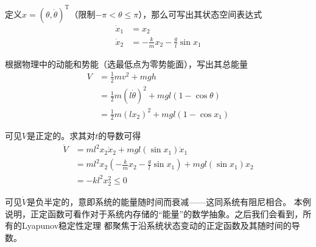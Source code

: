 \begin{example}[正定函数与能量]
  定义$x=(\theta,\dot{\theta})^\mathrm{T}$（限制$-\pi<\theta\le \pi$），那么可写出其状态空间表达式
  \begin{align*}
    \dot{x}_1&=x_2\\
    \dot{x}_2&=-\frac{k}{m}x_2-\frac{g}{l}\sin x_1
  \end{align*}
  
  根据物理中的动能和势能（选最低点为零势能面），写出其总能量\begin{align*}
    V&=\frac{1}{2}mv^2+mgh\\
    &=\frac{1}{2}m(l\dot{\theta})^2+mgl(1-\cos\theta)\\
    &=\frac{1}{2}m(lx_2)^2+mgl(1-\cos x_1)
  \end{align*}

  可见$V$是正定的。求其对$t$的导数可得\begin{align*}
    \dot{V}&=ml^2x_2\dot{x}_2+mgl(\sin x_1)\dot{x}_1\\
    &=ml^2x_2\left(-\frac{k}{m}x_2-\frac{g}{l}\sin x_1\right)+mgl(\sin x_1)x_2\\
    &=-kl^2x_2^2\le0
  \end{align*}

  可见$\dot{V}$是负半定的，意即系统的能量随时间而衰减——这同系统有阻尼相合。
  本例说明，正定函数可看作对于系统内存储的“能量”的数学抽象。之后我们会看到，所有的Lyapunov稳定性定理
  都聚焦于沿系统状态变动的正定函数及其随时间的导数。
\end{example}

